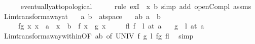 \begin{isabellebody}
\ \ \ \ \isamarkupfalse%
\ eventually{\isacharunderscore}{\kern0pt}at{\isacharunderscore}{\kern0pt}topological\isanewline
\ \ \ \ \isamarkupfalse%
\ {\isacharparenleft}{\kern0pt}rule\ exI\ {\isacharbrackleft}{\kern0pt}\ x{\isacharequal}{\kern0pt}{\isachardoublequoteopen}{\isacharminus}{\kern0pt}\ {\isacharbraceleft}{\kern0pt}b{\isacharbraceright}{\kern0pt}{\isachardoublequoteclose}{\isacharbrackright}{\kern0pt}{\isacharparenright}{\kern0pt}\ {\isacharparenleft}{\kern0pt}simp\ add{\isacharcolon}{\kern0pt}\ open{\isacharunderscore}{\kern0pt}Compl\ assms{\isacharparenright}{\kern0pt}\isanewline
{}\isamarkupfalse%
%
\endisatagproof
{\isafoldproof}%
%
\isadelimproof
\isanewline
%
\endisadelimproof
\isanewline
{}\isamarkupfalse%
\ Lim{\isacharunderscore}{\kern0pt}transform{\isacharunderscore}{\kern0pt}away{\isacharunderscore}{\kern0pt}at{\isacharcolon}{\kern0pt}\isanewline
\ \ \ a\ b\ {\isacharcolon}{\kern0pt}{\isacharcolon}{\kern0pt}\ {\isachardoublequoteopen}{\isacharprime}{\kern0pt}a{\isacharcolon}{\kern0pt}{\isacharcolon}{\kern0pt}t{}{\isacharunderscore}{\kern0pt}space{\isachardoublequoteclose}\isanewline
\ \ \ ab{\isacharcolon}{\kern0pt}\ {\isachardoublequoteopen}a\ {\isasymnoteq}\ b{\isachardoublequoteclose}\isanewline
\ \ \ \ \ fg{\isacharcolon}{\kern0pt}\ {\isachardoublequoteopen}{\isasymforall}x{\isachardot}{\kern0pt}\ x\ {\isasymnoteq}\ a\ {\isasymand}\ x\ {\isasymnoteq}\ b\ {\isasymlongrightarrow}\ f\ x\ {\isacharequal}{\kern0pt}\ g\ x{\isachardoublequoteclose}\isanewline
\ \ \ \ \ fl{\isacharcolon}{\kern0pt}\ {\isachardoublequoteopen}{\isacharparenleft}{\kern0pt}f\ {\isasymlonglongrightarrow}\ l{\isacharparenright}{\kern0pt}\ {\isacharparenleft}{\kern0pt}at\ a{\isacharparenright}{\kern0pt}{\isachardoublequoteclose}\isanewline
\ \ \ {\isachardoublequoteopen}{\isacharparenleft}{\kern0pt}g\ {\isasymlonglongrightarrow}\ l{\isacharparenright}{\kern0pt}\ {\isacharparenleft}{\kern0pt}at\ a{\isacharparenright}{\kern0pt}{\isachardoublequoteclose}\isanewline
%
\isadelimproof
\ \ %
\endisadelimproof
%
\isatagproof
{}\isamarkupfalse%
\ Lim{\isacharunderscore}{\kern0pt}transform{\isacharunderscore}{\kern0pt}away{\isacharunderscore}{\kern0pt}within{\isacharbrackleft}{\kern0pt}OF\ ab{\isacharcomma}{\kern0pt}\ of\ UNIV\ f\ g\ l{\isacharbrackright}{\kern0pt}\ fg\ fl\ \isamarkupfalse%
\ simp%
\endisatagproof
{\isafoldproof}%
%
\isadelimproof
%
\endisadelimproof

\end{isabellebody}
